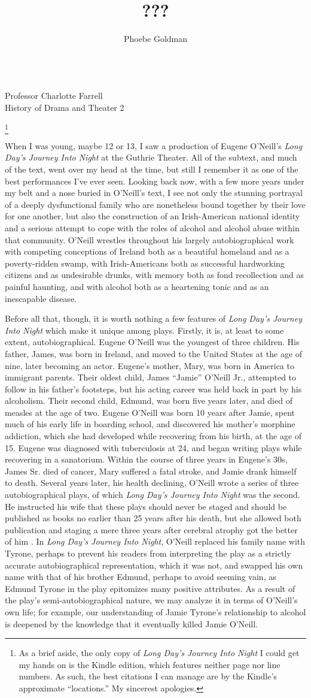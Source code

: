 \documentclass[letterpaper, 12pt]{article}
\title{???}
\author{Phoebe Goldman}
\date{\DTMDate{2020-05-13}}
\newcommand{\ldjin}{\textit{Long Day's Journey Into Night}}
\newcommand{\oneill}{O'Neill}
\newcommand{\theprof}{Professor Charlotte Farrell}
\newcommand{\theclass}{History of Drama and Theater 2}
\newcommand{\mlatitle}{\noindent\theauthor{}\hspace*{2cm}
\\\noindent\theprof{}\hspace*{2cm}
\\\noindent\theclass{}\hspace*{2cm}
\\\noindent\thedate{}\hspace*{2cm}
\begin{center}
  \thetitle{}\footnote{As a brief aside, the only copy of \ldjin{} I could get my hands on
  is the Kindle edition, which features neither page nor line numbers. As such,
  the best citations I can manage are by the Kindle's approximate
  \enquote{locations.} My sincerest apologies.}
\end{center}}
\begin{document}
\RaggedRight
\thispagestyle{plain}

\mlatitle{}

When I was young, maybe 12 or 13, I saw a production of Eugene \oneill{}'s
\ldjin{} at the Guthrie Theater. All of the subtext, and much of the text, went
over my head at the time, but still I remember it as one of the best
performances I've ever seen. Looking back now, with a few more years under my
belt and a nose buried in \oneill{}'s text, I see not only the stunning
portrayal of a deeply dysfunctional family who are nonetheless bound together
by their love for one another, but also the construction of an Irish-American
national identity and a serious attempt to cope with the roles of alcohol and
alcohol abuse within that community. \oneill{} wrestles throughout his largely
autobiographical work with competing conceptions of Ireland both as a beautiful
homeland and as a poverty-ridden swamp, with Irish-Americans both as successful
hardworking citizens and as undesirable drunks, with memory both as fond
recollection and as painful haunting, and with alcohol both as a heartening
tonic and as an inescapable disease.

Before all that, though, it is worth nothing a few features of \ldjin{} which
make it unique among plays. Firstly, it is, at least to some extent,
autobiographical. Eugene \oneill{} was the youngest of three children. His
father, James, was born in Ireland, and moved to the United States at the age
of nine, later becoming an actor. Eugene's mother, Mary, was born in America to
immigrant parents. Their oldest child, James \enquote{Jamie} \oneill{} Jr.,
attempted to follow in his father's footsteps, but his acting career was held
back in part by his alcoholism. Their second child, Edmund, was born five years
later, and died of measles at the age of two. Eugene \oneill{} was born 10
years after Jamie, spent much of his early life in boarding school, and
discovered his mother's morphine addiction, which she had developed while
recovering from his birth, at the age of 15. Eugene was diagnosed with
tuberculosis at 24, and began writing plays while recovering in a
sanatorium. Within the course of three years in Eugene's 30s, James Sr. died of
cancer, Mary suffered a fatal stroke, and Jamie drank himself to death. Several
years later, his health declining, \oneill{} wrote a series of three
autobiographical plays, of which \ldjin{} was the second. He instructed his
wife that these plays should never be staged and should be published as books
no earlier than 25 years after his death, but she allowed both publication and
staging a mere three years after cerebral atrophy got the better of him
\parencite[loc. 2826--2862]{timeline}. In \ldjin{}, \oneill{} replaced his
family name with Tyrone, perhaps to prevent his readers from interpreting the
play as a strictly accurate autobiographical representation, which it was not,
and swapped his own name with that of his brother Edmund, perhaps to avoid
seeming vain, as Edmund Tyrone in the play epitomizes many positive
attributes. As a result of the play's semi-autobiographical nature, we may
analyze it in terms of \oneill{}'s own life; for example, our understanding of
Jamie Tyrone's relationship to alcohol is deepened by the knowledge that it
eventually killed Jamie \oneill{}.
\end{document}
